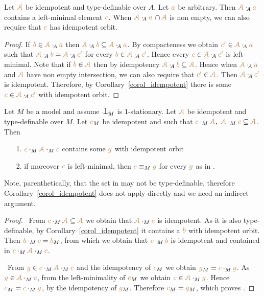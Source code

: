 \documentclass[creche.tex]{subfiles}
\begin{document}
\begin{proposition}\label{prop_minimal_existence1}
Let $\mrA$ be idempotent and type-definable over $A$.
Let ${\mr a}$ be arbitrary.
Then $\mrA\cdot_{\!A}{\mr a}$ contains a left-minimal element ${\mr c}$.
When $\mrA\cdot_{\!A}{\mr a}\,\cap\mrA$ is non empty, we can also require that ${\mr c}$ has idempotent orbit.
\end{proposition}
\begin{proof}
If ${\mr b}\in\mrA\cdot_{\!A}{\mr a}$ then $\mrA\cdot_{\!A}{\mr b}\subseteq\mrA\cdot_{\!A}{\mr a}$.
By compacteness we obtain ${\mr c'}\in\mrA\cdot_{\!A}{\mr a}$ such that $\mrA\cdot_{\!A}{\mr b}=\mrA\cdot_{\!A}{\mr c'}$ for every ${\mr b}\in\mrA\cdot_{\!A}{\mr c'}$.
Hence every ${\mr c}\in\mrA\cdot_{\!A}{\mr c'}$ is left-minimal.
Note that if ${\mr b}\in\mrA$ then by idempotency  $\mrA\cdot_{\!A}{\mr b}\subseteq\mrA$. Hence when $\mrA\cdot_{\!A}{\mr a}$ and $\mrA$ have non empty intersection, we can also require that ${\mr c'}\in\mrA$. 
Then $\mrA\cdot_{\!A}{\mr c'}$ is idempotent. 
Therefore, by Corollary~\ref{corol_idempotent} there is some ${\mr c}\in\mrA\cdot_{\!A}{\mr c'}$ with idempotent orbit.
\end{proof}

\begin{proposition}\label{prop_minimal_existence2}
Let $M$ be a model and assume $\cnonfork_{\!M}$ is $1$-stationary.
Let $\mrA$ be idempotent and type-definable over $M$.
Let ${\mr c}_M$ be idempotent and such that 
${\mr c}\cdot_M\mrA,\ \mrA\cdot_M{\mr c}\subseteq\mrA$.
Then
\begin{itemize}
\item[1.]  ${\mr c}\cdot_M\mrA\cdot_M{\mr c}$ contains some ${\mr g}$ with idempotent orbit 
\item[2.] if moreover ${\mr c}$ is left-minimal, then ${\mr c}\equiv_M{\mr g}$ for every ${\mr g}$ as in .
\end{itemize} 
\end{proposition}

Note, parenthetically, that the set in  may not be type-definable, 
therefore Corollary~\ref{corol_idempotent} does not apply 
directly and we need an indirect argument.

\begin{proof} \  
From ${\mr c}\cdot_M\mrA\subseteq\mrA$ we obtain that $\mrA\cdot_M{\mr c}$ is idempotent.
As it is  also type-definable, 
by Corollary~\ref{corol_idempotent} it contains a ${\mr b}$ with idempotent orbit.
Then ${\mr b}\cdot_M{\mr c}={\mr b}_M$, from which we obtain that ${\mr c}\cdot_M{\mr b}$ is idempotent and contained in ${\mr c}\cdot_M\mrA\cdot_M{\mr c}$.

 \ From ${\mr g}\in{\mr c}\cdot_M\mrA\cdot_M{\mr c}$ and the idempotency of ${\mr c}_M$ 
we obtain ${\mr g}_M={\mr c}\cdot_M{\mr g}$.
As ${\mr g}\in\mrA\cdot_M{\mr c}$, from the left-minimality of ${\mr c}_M$ we obtain ${\mr c}\in\mrA\cdot_M{\mr g}$.
Hence ${\mr c}_M={\mr c}\cdot_M{\mr g}$, by the idempotency of ${\mr g}_M$.
Therefore ${\mr c}_M={\mr g}_M$, which proves \ssf{2}.
\end{proof}
\end{document}
